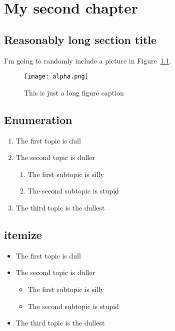 
\chapter{My second chapter}

\graphicspath{{Chapter2/Figs/Box1/}{Chapter2/Figs/Box2/}}



\section[Short title]{Reasonably long section title}

I'm going to randomly include a picture in Figure~\ref{fig:Figure1}.

\bigskip
\begin{figure}[htbp!]
\centering
\texttt{[image: alpha.png]}
\caption[Figure 1]{This is just a long figure caption}
\label{fig:Figure1}
\end{figure}


\section*{Enumeration}
\begin{enumerate}
\item The first topic is dull
\item The second topic is duller
\begin{enumerate}
\item The first subtopic is silly
\item The second subtopic is stupid
\end{enumerate}
\item The third topic is the dullest
\end{enumerate}

\section*{itemize}
\begin{itemize}
\item The first topic is dull
\item The second topic is duller
\begin{itemize}
\item The first subtopic is silly
\item The second subtopic is stupid
\end{itemize}
\item The third topic is the dullest
\end{itemize}


